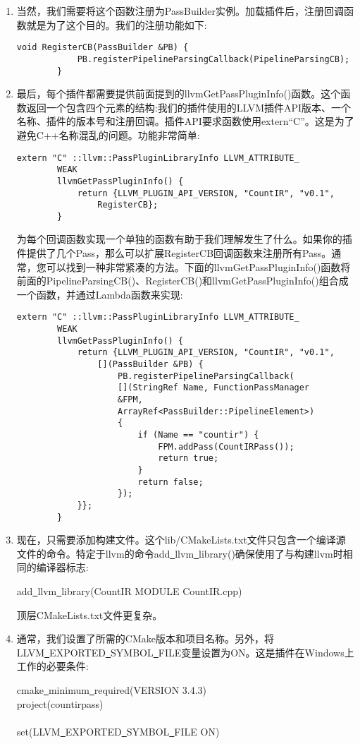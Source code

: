 \begin{enumerate}
	\item 当然，我们需要将这个函数注册为PassBuilder实例。加载插件后，注册回调函数就是为了这个目的。我们的注册功能如下:
	\begin{lstlisting}[caption={}]
		void RegisterCB(PassBuilder &PB) {
			PB.registerPipelineParsingCallback(PipelineParsingCB);
		}
	\end{lstlisting}
	
	\item 最后，每个插件都需要提供前面提到的llvmGetPassPluginInfo()函数。这个函数返回一个包含四个元素的结构:我们的插件使用的LLVM插件API版本、一个名称、插件的版本号和注册回调。插件API要求函数使用extern“C”。这是为了避免C++名称混乱的问题。功能非常简单:
	\begin{lstlisting}[caption={}]
		extern "C" ::llvm::PassPluginLibraryInfo LLVM_ATTRIBUTE_
		WEAK
		llvmGetPassPluginInfo() {
			return {LLVM_PLUGIN_API_VERSION, "CountIR", "v0.1",
				RegisterCB};
		}
	\end{lstlisting}
	为每个回调函数实现一个单独的函数有助于我们理解发生了什么。如果你的插件提供了几个Pass，那么可以扩展RegisterCB回调函数来注册所有Pass。通常，您可以找到一种非常紧凑的方法。下面的llvmGetPassPluginInfo()函数将前面的PipelineParsingCB()、RegisterCB()和llvmGetPassPluginInfo()组合成一个函数，并通过Lambda函数来实现:
	\begin{lstlisting}[caption={}]
		extern "C" ::llvm::PassPluginLibraryInfo LLVM_ATTRIBUTE_
		WEAK
		llvmGetPassPluginInfo() {
			return {LLVM_PLUGIN_API_VERSION, "CountIR", "v0.1",
				[](PassBuilder &PB) {
					PB.registerPipelineParsingCallback(
					[](StringRef Name, FunctionPassManager 
					&FPM,
					ArrayRef<PassBuilder::PipelineElement>) 
					{
						if (Name == "countir") {
							FPM.addPass(CountIRPass());
							return true;
						}
						return false;
					});
			}};
		}
	\end{lstlisting}
	
	\item 现在，只需要添加构建文件。这个lib/CMakeLists.txt文件只包含一个编译源文件的命令。特定于llvm的命令add\underline{~}llvm\underline{~}library()确保使用了与构建llvm时相同的编译器标志:
	\begin{tcolorbox}[colback=white,colframe=black]
		add\underline{~}llvm\underline{~}library(CountIR MODULE CountIR.cpp)
	\end{tcolorbox}
	顶层CMakeLists.txt文件更复杂。
	
	\item 通常，我们设置了所需的CMake版本和项目名称。另外，将LLVM\underline{~}EXPORTED\underline{~}SYMBOL\underline{~}FILE变量设置为ON。这是插件在Windows上工作的必要条件:
	\begin{tcolorbox}[colback=white,colframe=black]
		cmake\underline{~}minimum\underline{~}required(VERSION 3.4.3) \\
		project(countirpass)\\
		\\
		set(LLVM\underline{~}EXPORTED\underline{~}SYMBOL\underline{~}FILE ON)
	\end{tcolorbox}
	

\end{enumerate}
